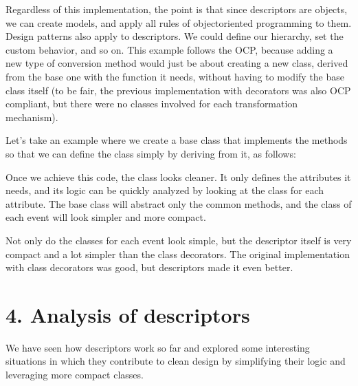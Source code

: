 \documentclass[a4paper,10pt,english]{sphinxmanual}
\begin{document}
Regardless of this implementation, the point is that since descriptors are objects, we can
create models, and apply all rules of object\sphinxhyphen{}oriented programming to them. Design patterns
also apply to descriptors. We could define our hierarchy, set the custom behavior, and so
on. This example follows the OCP, because adding a new type of conversion method would just be about creating a
new class, derived from the base one with the function it needs, without having to modify
the base class itself (to be fair, the previous implementation with decorators was also OCP\sphinxhyphen{}
compliant, but there were no classes involved for each transformation mechanism).

Let’s take an example where we create a base class that implements the  methods so that we can define the  class simply by deriving
from it, as follows:

\begin{sphinxVerbatim}[commandchars=\\\{\}]
 
      
      
      
      
\end{sphinxVerbatim}

Once we achieve this code, the class looks cleaner. It only defines the attributes it needs,
and its logic can be quickly analyzed by looking at the class for each attribute. The base
class will abstract only the common methods, and the class of each event will look simpler
and more compact.

Not only do the classes for each event look simple, but the descriptor itself is very compact
and a lot simpler than the class decorators. The original implementation with class
decorators was good, but descriptors made it even better.


\section{4. Analysis of descriptors}
\label{\detokenize{chapters/6_descriptors/index:analysis-of-descriptors}}
We have seen how descriptors work so far and explored some interesting situations in
which they contribute to clean design by simplifying their logic and leveraging more
compact classes.
\end{document}
